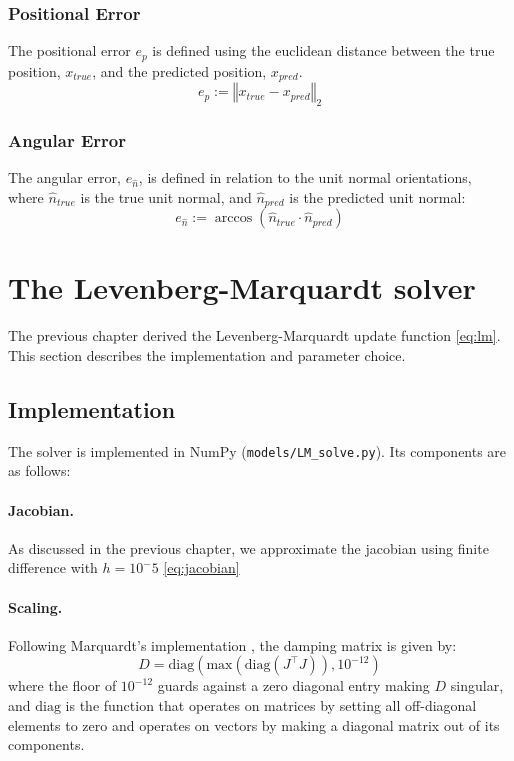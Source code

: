 \documentclass[12pt,a4paper]{report}
\begin{document}
\subsubsection{Positional Error}
The positional error $e_p$ is defined using the euclidean distance between the true position, $x_{true}$, and the predicted position, $x_{pred}$.
\begin{equation}
  e_{p} := \left\Vert x_{true} - x_{pred} \right\Vert_2
\end{equation}

\subsubsection{Angular Error}
The angular error, $e_{\hat{n}}$, is defined in relation to the unit normal orientations, where $\hat{n}_{true}$ is the true unit normal, and $\hat{n}_{pred}$ is the predicted unit normal:
\begin{equation}
  e_{\hat{n}} := \arccos \left( \hat{n}_{true} \cdot \hat{n}_{pred} \right)
\end{equation}

\section{The Levenberg-Marquardt solver}\label{sec:methods-lm}
The previous chapter derived the Levenberg-Marquardt update function \ref{eq:lm}. This section describes the implementation and parameter choice. 

\subsection{Implementation}
The solver is implemented in NumPy (\lstinline[style=python]|models/LM_solve.py|). Its components are as follows:

\paragraph{Jacobian.} As discussed in the previous chapter, we approximate the jacobian using finite difference with $h = 10^-5$ \ref{eq:jacobian}

\paragraph{Scaling.} Following Marquardt's implementation \cite{marquardt1963}, the damping matrix is given by:
\begin{equation}
  D = \text{diag}(\text{max}(\text{diag}(J^\top J)), 10^{-12})
\end{equation}
where the floor of $10^{-12}$ guards against a zero diagonal entry making $D$ singular, and $\text{diag}$ is the function that operates on matrices by setting all off-diagonal elements to zero and operates on vectors by making a diagonal matrix out of its components.
\end{document}
